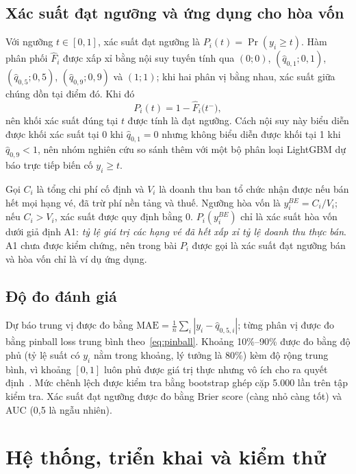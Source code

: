 \documentclass{IEEEtran}
\begin{document}
\subsection{Xác suất đạt ngưỡng và ứng dụng cho hòa vốn}
Với ngưỡng $t \in [0, 1]$, xác suất đạt ngưỡng là $P_i(t) = \Pr(y_i \geq t)$. Hàm phân phối $\hat{F}_i$ được xấp xỉ bằng nội suy tuyến tính qua $(0; 0)$, $(\hat{q}_{0{,}1}; 0{,}1)$, $(\hat{q}_{0{,}5}; 0{,}5)$, $(\hat{q}_{0{,}9}; 0{,}9)$ và $(1; 1)$; khi hai phân vị bằng nhau, xác suất giữa chúng dồn tại điểm đó. Khi đó
\begin{equation}
P_i(t) = 1 - \hat{F}_i\big(t^{-}\big),
\label{eq:pbe}
\end{equation}
nên khối xác suất đúng tại $t$ được tính là đạt ngưỡng. Cách nội suy này biểu diễn được khối xác suất tại 0 khi $\hat{q}_{0{,}1} = 0$ nhưng không biểu diễn được khối tại 1 khi $\hat{q}_{0{,}9} < 1$, nên nhóm nghiên cứu so sánh thêm với một bộ phân loại LightGBM dự báo trực tiếp biến cố $y_i \geq t$.

Gọi $C_i$ là tổng chi phí cố định và $V_i$ là doanh thu ban tổ chức nhận được nếu bán hết mọi hạng vé, đã trừ phí nền tảng và thuế. Ngưỡng hòa vốn là $y^{BE}_i = C_i / V_i$; nếu $C_i > V_i$, xác suất được quy định bằng 0. $P_i(y^{BE}_i)$ chỉ là xác suất hòa vốn dưới giả định A1: \textit{tỷ lệ giá trị các hạng vé đã hết xấp xỉ tỷ lệ doanh thu thực bán}. A1 chưa được kiểm chứng, nên trong bài $P_i$ được gọi là xác suất đạt ngưỡng bán và hòa vốn chỉ là ví dụ ứng dụng.

\subsection{Độ đo đánh giá}
Dự báo trung vị được đo bằng $\mathrm{MAE} = \frac{1}{n}\sum_{i} |y_i - \hat{q}_{0{,}5,i}|$; từng phân vị được đo bằng pinball loss trung bình theo~\eqref{eq:pinball}. Khoảng 10\%--90\% được đo bằng độ phủ (tỷ lệ suất có $y_i$ nằm trong khoảng, lý tưởng là 80\%) kèm độ rộng trung bình, vì khoảng $[0, 1]$ luôn phủ được giá trị thực nhưng vô ích cho ra quyết định~\cite{gneiting2007}. Mức chênh lệch được kiểm tra bằng bootstrap ghép cặp 5.000 lần trên tập kiểm tra. Xác suất đạt ngưỡng được đo bằng Brier score (càng nhỏ càng tốt) và AUC (0,5 là ngẫu nhiên).

\section{Hệ thống, triển khai và kiểm thử}
\label{sec:system}
\end{document}
